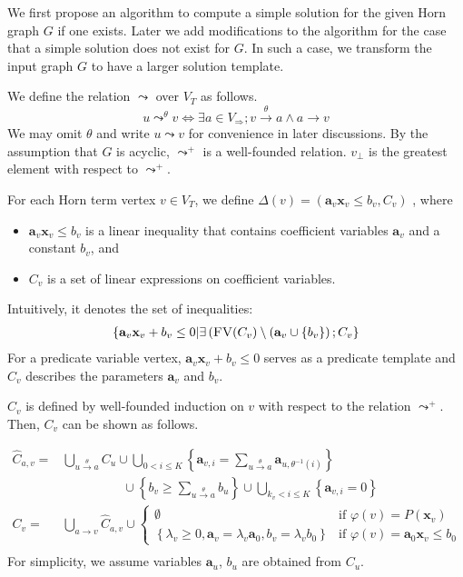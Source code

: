 \documentclass[a4paper,12pt]{article}
\newcommand{\edge}[2]{#1\rightarrow#2}
\newcommand{\edgel}[3]{#1\xrightarrow{#2}#3}
\begin{document}
We first propose an algorithm to compute a simple solution for the
given Horn graph $G$ if one exists.  Later we add modifications to the
algorithm for the case that a simple solution does not exist for $G$.
In such a case, we transform the input graph $G$ to have a larger
solution template.

We define the relation $\leadsto$ over $V_T$ as follows.
\[ u \mathop{\leadsto}^\theta v \Longleftrightarrow
\exists a \in V_\Rightarrow; \edgel{v}{\theta}{a} \wedge \edge{a}{v} \]
We may omit $\theta$ and write $u \leadsto v$ for convenience in later
discussions. By the assumption that $G$ is acyclic, $\leadsto^+$ is a
well-founded relation. $v_\bot$ is the greatest element with respect
to $\leadsto^+$.

For each Horn term vertex $v \in V_T$, we define
$\Delta(v) = (\mathbf{a}_v \mathbf{x}_v \leq b_v, C_v)$
, where
\begin{itemize}
\item $\mathbf{a}_v \mathbf{x}_v \leq b_v$ is a linear inequality that
  contains coefficient variables $\mathbf{a}_v$ and a constant $b_v$,
  and
\item $C_v$ is a set of linear expressions on coefficient variables.
\end{itemize}
Intuitively, it denotes the set of inequalities:
\begin{align*}
\left\lbrace
 \mathbf{a}_v \mathbf{x}_v + b_v \leq 0 \middle|
 \exists \left( \textsc{FV}(C_v)
  \setminus (\mathbf{a}_v \cup \left\lbrace b_v \right\rbrace
 \right); C_v
\right\rbrace
\end{align*}
For a predicate variable vertex, $\mathbf{a}_v \mathbf{x}_v + b_v \leq
0$ serves as a predicate template and $C_v$ describes the parameters
$\mathbf{a}_v$ and $b_v$.

$C_v$ is defined by well-founded induction on $v$ with respect to the
relation $\leadsto^+$. Then, $C_v$ can be shown as follows.

\begin{align*}
\hat C_{a,v} = &
 \bigcup_{\edgel{u}{\theta}{a}} C_u \cup
 \bigcup_{0 < i \leq K}
 \left\lbrace
  \mathbf{a}_{v,i} = \sum_{\edgel{u}{\theta}{a}} \mathbf{a}_{u, \theta^{-1} (i)}
 \right\rbrace \\
 & \hspace{2cm} \cup
 \left\lbrace
  b_v \geq \sum_{\edgel{u}{\theta}{a}} b_u
 \right\rbrace \cup
 \bigcup_{k_v < i \leq K}
 \left\lbrace \mathbf{a}_{v,i} = 0 \right\rbrace
\\
C_v = & \bigcup_{\edge{a}{v}} \hat C_{a,v} \cup
\begin{cases}
\emptyset
& \mbox{if } \varphi(v) = P(\mathbf{x}_v) \\
\left\lbrace
 \lambda_v \geq 0, \mathbf{a}_v = \lambda_v \mathbf{a}_0,
 b_v = \lambda_v b_0
\right\rbrace
& \mbox{if } \varphi(v) = \mathbf{a}_0 \mathbf{x}_v \leq b_0
\end{cases} \\
\end{align*}
For simplicity, we assume variables $\mathbf{a}_u$, $b_u$ are obtained
from $C_u$.
\end{document}
